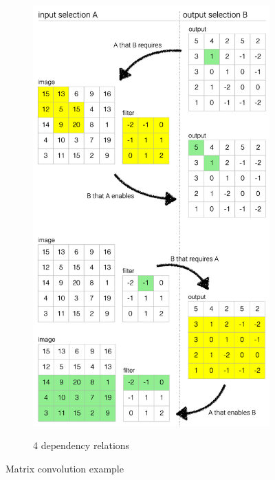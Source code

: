 \begin{figure}
   \begin{subfigure}{\textwidth}
      {\includegraphics[scale=0.4]{fig/example/4-relations.png}}
      \caption{4 dependency relations}
   \end{subfigure}
   \begin{subfigure}[t]{3.3in}
      \small
      
   \end{subfigure}
   \begin{subfigure}[t]{2.1in}
      \small
      
   \end{subfigure}
   \caption{Matrix convolution example}
\end{figure}
